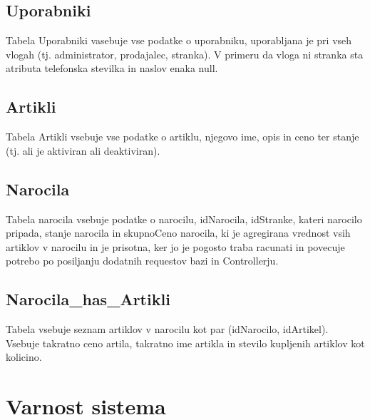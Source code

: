 \documentclass[a4paper,12pt]{report}
\begin{document}
\section{Uporabniki}

Tabela Uporabniki vasebuje vse podatke o uporabniku, uporabljana je pri vseh vlogah (tj. administrator, prodajalec, stranka).
V primeru da vloga ni stranka sta atributa telefonska stevilka in naslov enaka null.

\section{Artikli}

Tabela Artikli vsebuje vse podatke o artiklu, njegovo ime, opis in ceno ter stanje (tj. ali je aktiviran ali deaktiviran).

\section{Narocila}

Tabela narocila vsebuje podatke o narocilu, idNarocila, idStranke, kateri narocilo pripada, stanje narocila in skupnoCeno narocila, ki je agregirana vrednost vsih artiklov v narocilu in je prisotna, ker jo je pogosto traba racunati in povecuje potrebo po posiljanju dodatnih requestov bazi in Controllerju.

\section{Narocila\_has\_Artikli}

Tabela vsebuje seznam artiklov v narocilu kot par (idNarocilo, idArtikel). Vsebuje takratno ceno artila, takratno ime artikla in stevilo kupljenih artiklov kot kolicino. 



\chapter{Varnost sistema}
\end{document}
